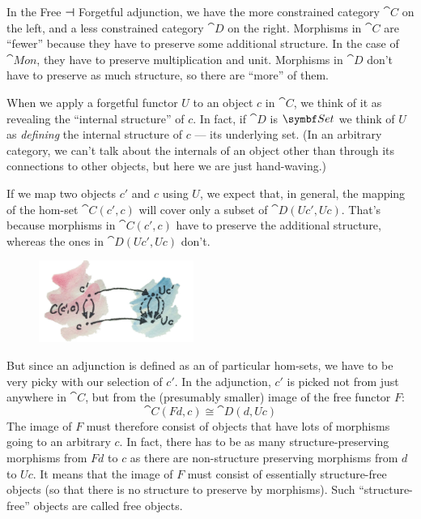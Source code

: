 In the Free ⊣ Forgetful adjunction, we have the more constrained
category $\cat{C}$ on the left, and a less constrained category $\cat{D}$
on the right. Morphisms in $\cat{C}$ are ``fewer'' because they have to
preserve some additional structure. In the case of $\cat{Mon}$, they
have to preserve multiplication and unit. Morphisms in $\cat{D}$ don't
have to preserve as much structure, so there are ``more'' of them.

When we apply a forgetful functor $U$ to an object $c$ in
$\cat{C}$, we think of it as revealing the ``internal structure'' of
$c$. In fact, if $\cat{D}$ is $\Set$ we think of $U$
as \emph{defining} the internal structure of $c$ --- its
underlying set. (In an arbitrary category, we can't talk about the
internals of an object other than through its connections to other
objects, but here we are just hand-waving.)

If we map two objects $c'$ and $c$ using $U$,
we expect that, in general, the mapping of the hom-set
$\cat{C}(c', c)$ will cover only a subset of
$\cat{D}(U c', U c)$. That's because morphisms in
$\cat{C}(c', c)$ have to preserve the additional structure,
whereas the ones in $\cat{D}(U c', U c)$ don't.

\begin{figure}[H]
  \centering
  \includegraphics[width=0.45\textwidth]{images/forgettingmorphisms.jpg}
\end{figure}

\noindent
But since an adjunction is defined as an  of
particular hom-sets, we have to be very picky with our selection of
$c'$. In the adjunction, $c'$ is picked not
from just anywhere in $\cat{C}$, but from the (presumably smaller) image
of the free functor $F$:
\[\cat{C}(F d, c) \cong \cat{D}(d, U c)\]
The image of $F$ must therefore consist of objects that have lots
of morphisms going to an arbitrary $c$. In fact, there has to be
as many structure-preserving morphisms from $F d$ to $c$
as there are non-structure preserving morphisms from $d$ to
$U c$. It means that the image of $F$ must consist of
essentially structure-free objects (so that there is no structure to
preserve by morphisms). Such ``structure-free'' objects are called free
objects.

